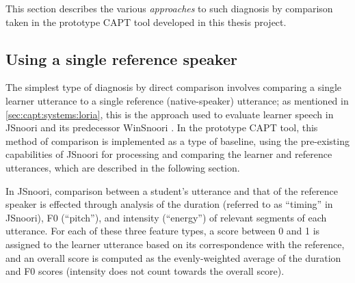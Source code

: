 This section describes the various \textit{approaches} to such diagnosis by comparison taken in the prototype CAPT tool developed in this thesis project. 
  



	
	\subsection{Using a single reference speaker}
	\label{sec:compare:single}
	
	
	The simplest type of diagnosis by direct comparison involves comparing a single learner utterance to a single reference (native-speaker) utterance; as mentioned in \cref{sec:capt:systems:loria}, this is the approach used to evaluate learner speech in JSnoori and its predecessor WinSnoori \citep{Bonneau2004,Henry2007,Bonneau2011}. 
	In the prototype CAPT tool, this method of comparison is implemented as a type of baseline, using the pre-existing capabilities of JSnoori for processing and comparing the learner and reference utterances, which are described in the following section. 
	
	
	In JSnoori, comparison between a student's utterance and that of the reference speaker is effected through analysis of the duration (referred to as ``timing'' in JSnoori), F0 (``pitch''), and intensity (``energy'') of relevant segments of each utterance.  For each of these three feature types, a score between 0 and 1 is assigned to the learner utterance based on its correspondence with the reference, and an overall score is computed as the evenly-weighted average of the duration and F0 scores (intensity does not count towards the overall score). 
	
